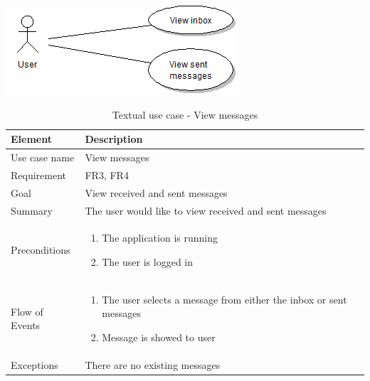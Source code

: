 \begin{table}
\begin{center}
\begin{center}
\includegraphics[width=\textwidth]{view_messages}
\end{center}
\begin{tabular}{p{3cm}|p{12cm}}\hline
\textbf{Element} & \textbf{Description} \\ \hline \hline
Use case name & View messages \\
Requirement & FR3, FR4 \\
Goal & View received and sent messages \\
Summary &The user would like to view received and sent messages \\ \hline
Preconditions &
\begin{enumerate}
\item{}The application is running
\item{}The user is logged in
\end{enumerate} \\ \hline
Flow of Events &
\begin{enumerate}
\item{}The user selects a message from either the inbox or sent messages
\item{}Message is showed to user
\end{enumerate} \\ \hline
Exceptions & There are no existing messages\\ \hline
\end{tabular}
\end{center}
\caption{Textual use case - View messages} \label{tab:viewmessages}
\end{table}

